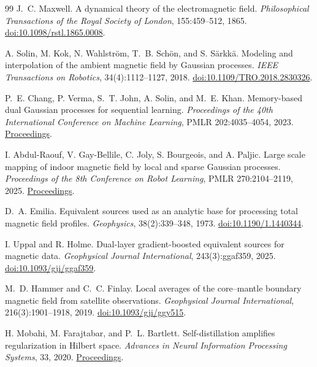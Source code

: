 \documentclass[11pt]{article}
\begin{document}
{\small
\begin{thebibliography}{99}
J.~C. Maxwell.
A dynamical theory of the electromagnetic field.
\emph{Philosophical Transactions of the Royal Society of London}, 155:459--512, 1865.
\href{https://doi.org/10.1098/rstl.1865.0008}{doi:10.1098/rstl.1865.0008}.

A. Solin, M. Kok, N. Wahlstr\"om, T.~B. Sch\"on, and S. S\"arkk\"a.
Modeling and interpolation of the ambient magnetic field by Gaussian processes.
\emph{IEEE Transactions on Robotics}, 34(4):1112--1127, 2018.
\href{https://doi.org/10.1109/TRO.2018.2830326}{doi:10.1109/TRO.2018.2830326}.

P.~E. Chang, P. Verma, S.~T. John, A. Solin, and M.~E. Khan.
Memory-based dual Gaussian processes for sequential learning.
\emph{Proceedings of the 40th International Conference on Machine Learning},
PMLR 202:4035--4054, 2023.
\href{https://proceedings.mlr.press/v202/chang23a.html}{Proceedings}.

I. Abdul-Raouf, V. Gay-Bellile, C. Joly, S. Bourgeois, and A. Paljic.
Large scale mapping of indoor magnetic field by local and sparse Gaussian
processes.
\emph{Proceedings of the 8th Conference on Robot Learning},
PMLR 270:2104--2119, 2025.
\href{https://proceedings.mlr.press/v270/abdul-raouf25a.html}{Proceedings}.

D.~A. Emilia.
Equivalent sources used as an analytic base for processing total magnetic
field profiles.
\emph{Geophysics}, 38(2):339--348, 1973.
\href{https://doi.org/10.1190/1.1440344}{doi:10.1190/1.1440344}.

I. Uppal and R. Holme.
Dual-layer gradient-boosted equivalent sources for magnetic data.
\emph{Geophysical Journal International}, 243(3):ggaf359, 2025.
\href{https://doi.org/10.1093/gji/ggaf359}{doi:10.1093/gji/ggaf359}.

M.~D. Hammer and C.~C. Finlay.
Local averages of the core--mantle boundary magnetic field from satellite observations.
\emph{Geophysical Journal International}, 216(3):1901--1918, 2019.
\href{https://doi.org/10.1093/gji/ggy515}{doi:10.1093/gji/ggy515}.

H. Mobahi, M. Farajtabar, and P.~L. Bartlett.
Self-distillation amplifies regularization in Hilbert space.
\emph{Advances in Neural Information Processing Systems}, 33, 2020.
\href{https://proceedings.neurips.cc/paper/2020/hash/2288f691b58edecadcc9a8691762b4fd-Abstract.html}{Proceedings}.


\end{thebibliography}}
\end{document}
